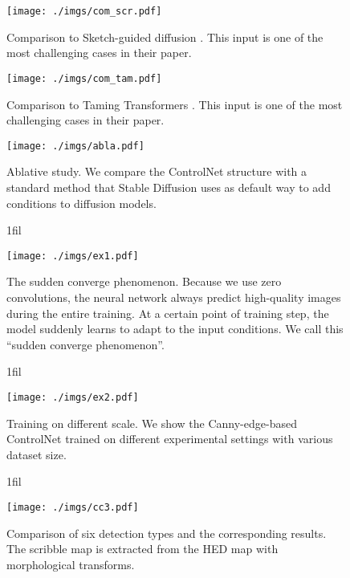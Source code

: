 \documentclass{article}
\makeatletter
\newcommand*{\centerfloat}{%
	\parindent \z@
	\leftskip \z@ \@plus 1fil \@minus \textwidth
	\rightskip\leftskip
	\parfillskip \z@skip}
\makeatother
\begin{document}
\begin{figure}
	\centering
	\texttt{[image: ./imgs/com\_scr.pdf]}
	\caption{Comparison to Sketch-guided diffusion \cite{voynov2022sketch}. This input is one of the most challenging cases in their paper.}
	\label{fig:scr} 
\end{figure}

\begin{figure}
	\centering
	\texttt{[image: ./imgs/com\_tam.pdf]}
	\caption{Comparison to Taming Transformers \cite{DBLP:journals/corr/abs-2012-09841}. This input is one of the most challenging cases in their paper.}
	\label{fig:tam} 
\end{figure}

\begin{figure}
	\centering
	\texttt{[image: ./imgs/abla.pdf]}
	\caption{Ablative study. We compare the ControlNet structure with a standard method that Stable Diffusion uses as default way to add conditions to diffusion models.}
	\label{fig:abla} 
\end{figure}

\begin{figure}
	\centerfloat
	\begin{minipage}{1.5\linewidth}
		\texttt{[image: ./imgs/ex1.pdf]}
		\caption{The sudden converge phenomenon. Because we use zero convolutions, the neural network always predict high-quality images during the entire training. At a certain point of training step, the model suddenly learns to adapt to the input conditions. We call this ``sudden converge phenomenon''.}
	\label{fig:ex1} 	\end{minipage}

\end{figure}

\begin{figure}
	\centerfloat
	\begin{minipage}{1.5\linewidth}
		\texttt{[image: ./imgs/ex2.pdf]}
		\caption{Training on different scale. We show the Canny-edge-based ControlNet trained on different experimental settings with various dataset size.}
	\label{fig:ex2} 	\end{minipage}

\end{figure}

\begin{figure}
	\centerfloat
	\begin{minipage}{1.4\linewidth}
		\texttt{[image: ./imgs/cc3.pdf]}
		\caption{Comparison of six detection types and the corresponding results. The scribble map is extracted from the HED map with morphological transforms.}
	\label{fig:cc3} 	\end{minipage}

\end{figure}
\end{document}

